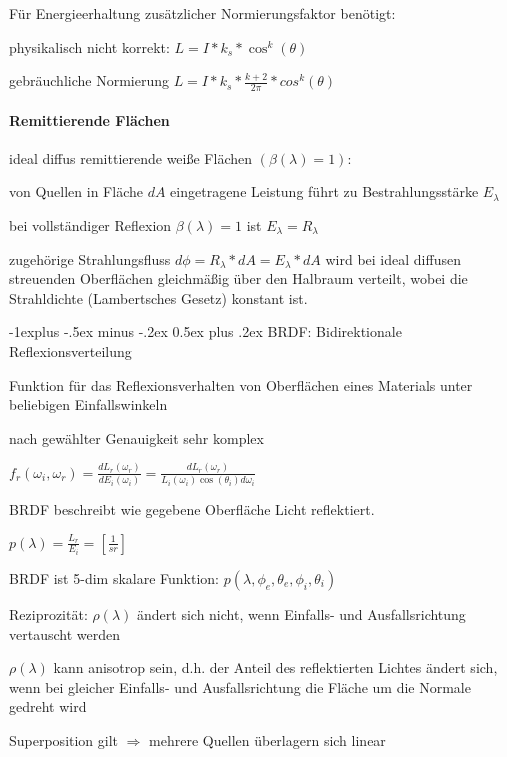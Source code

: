 \documentclass[landscape]{article}
\makeatletter
\renewcommand{\subsection}{\@startsection{subsection}{2}{0mm}%
                                {-1explus -.5ex minus -.2ex}%
                                {0.5ex plus .2ex}%
                                {\normalfont\normalsize\bfseries}}
\makeatother
\begin{document}
\begin{multicols}{3}
  Für Energieerhaltung zusätzlicher Normierungsfaktor benötigt:
  \begin{itemize*}
    \item physikalisch nicht korrekt:  $L=I*k_s*\cos^k(\theta)$
    \item gebräuchliche Normierung $L=I*k_s*\frac{k+2}{2\pi}*cos^k(\theta)$
  \end{itemize*}
  
  \paragraph{Remittierende Flächen}
  ideal diffus remittierende weiße Flächen $(\beta(\lambda) = 1)$:
  \begin{itemize*}
    \item von Quellen in Fläche $dA$ eingetragene Leistung führt zu Bestrahlungsstärke $E_{\lambda}$
    \item bei vollständiger Reflexion $\beta(\lambda) = 1$ ist $E_{\lambda} = R_{\lambda}$
    \item zugehörige Strahlungsfluss $d\phi = R_{\lambda} * dA = E_{\lambda} * dA$ wird bei ideal diffusen streuenden Oberflächen gleichmäßig über den Halbraum verteilt, wobei die Strahldichte (Lambertsches Gesetz) konstant ist.
  \end{itemize*}
  
  \subsection{BRDF: Bidirektionale Reflexionsverteilung}
  \begin{itemize*}
    \item Funktion für das Reflexionsverhalten von Oberflächen eines Materials unter beliebigen Einfallswinkeln
    \item nach gewählter Genauigkeit sehr komplex
    \item $f_r(\omega_i, \omega_r)=\frac{dL_r(\omega_r)}{dE_i(\omega_i)}=\frac{dL_r(\omega_r)}{L_i(\omega_i)\cos(\theta_i)d\omega_i}$
    \item BRDF beschreibt wie gegebene Oberfläche Licht reflektiert.
    \item $p(\lambda)=\frac{L_r}{E_i}=[\frac{1}{sr}]$
    \item BRDF ist 5-dim skalare Funktion: $p(\lambda, \phi_e, \theta_e, \phi_i, \theta_i)$
    \item Reziprozität: $\rho(\lambda)$ ändert sich nicht, wenn Einfalls- und Ausfallsrichtung vertauscht werden
    \item $\rho(\lambda)$ kann anisotrop sein, d.h. der Anteil des reflektierten Lichtes ändert sich, wenn bei gleicher Einfalls- und Ausfallsrichtung die Fläche um die Normale gedreht wird
    \item Superposition gilt $\Rightarrow$ mehrere Quellen überlagern sich linear
  \end{itemize*}
  

\end{multicols}
\end{document}
